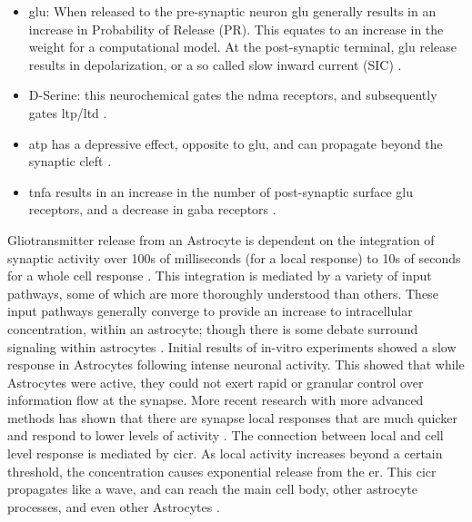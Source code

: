     \begin{itemize}
      \item \Gls{glu}: When released to the pre-synaptic neuron \Gls{glu} generally
        results in an increase in Probability of Release (PR). This equates to
        an increase in the weight for a computational model. At the
        post-synaptic terminal, \Gls{glu} release results in depolarization, or
        a so called slow inward current (SIC) \parencite{pitta_2016}.
      \item D-Serine: this neurochemical gates the \gls{ndma} receptors, and
        subsequently gates \Gls{ltp}/\Gls{ltd} \parencite{mederos_2018}.
      \item \Gls{atp} has a depressive effect, opposite to \gls{glu}, and can
        propagate beyond the synaptic cleft \parencite{mederos_2018}.
      \item \Gls{tnfa} results in an increase in the number of post-synaptic
        surface \Gls{glu} receptors, and a decrease in \Gls{gaba} receptors
        \parencite{chung_2015}.
    \end{itemize}

    Gliotransmitter release from an Astrocyte is dependent on the integration of
    synaptic activity over 100s of milliseconds (for a local response)
    \parencite{pitta_2016} to 10s of seconds for a whole cell response
    \parencite{mederos_2018}. This integration is mediated by a variety of input
    pathways, some of which are more thoroughly understood than others. These
    input pathways generally converge to provide an increase to intracellular
    \ca concentration, within an astrocyte; though there is some debate surround
    \ca signaling within astrocytes \parencite{mederos_2018}. Initial results of
    in-vitro experiments showed a slow \ca response in Astrocytes following
    intense neuronal activity. This showed that while Astrocytes were active,
    they could not exert rapid or granular control over information flow at the
    synapse. More recent research with more advanced methods has shown that
    there are synapse local \ca responses that are much quicker and respond to
    lower levels of activity \parencite{araque_2014}. The connection between local
    and cell level response is mediated by \Gls{cicr}. As local activity
    increases beyond a certain threshold, the \ca concentration causes
    exponential \ca release from the \Gls{er}. This \Gls{cicr} propagates like a
    wave, and can reach the main cell body, other astrocyte processes, and even
    other Astrocytes \parencite{manninen_2018}.

